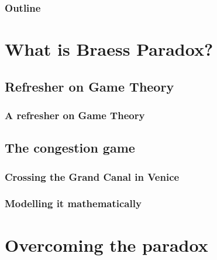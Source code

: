 \documentclass[aspectratio=169]{beamer}
\title{\projtitle}
\author{Nikhil Sethukumar \and Vishnu Varadan }
\date{\today}
\subtitle{Complex Social Systems, Agent Based Modelling \\ Fall 2022}
\institute{ETH Z\"urich}
\begin{document}
\begin{frame}

    \titlepage

\end{frame}

\begin{frame}
    \frametitle{Outline}

    \tableofcontents

\end{frame}

\section{What is Braess Paradox?}

\subsection{Refresher on Game Theory}

\begin{frame}
    \frametitle{A refresher on Game Theory}




\end{frame}

\subsection{The congestion game}

\begin{frame}
    \frametitle{Crossing the Grand Canal in Venice}


\end{frame}

\begin{frame}
    \frametitle{Modelling it mathematically}


\end{frame}

\section{Overcoming the paradox}
\end{document}
